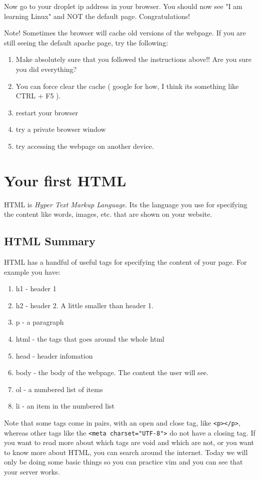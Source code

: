 \documentclass[12pt]{article}
\begin{document}
Now go to your droplet ip address in your browser. You should now see "I am learning Linux" and NOT the default page. Congratulations!

Note! Sometimes the browser will cache old versions of the webpage. If you are still seeing the default apache page, try the following:

\begin{enumerate}
\item Make absolutely sure that you followed the instructions above!! Are you sure you did everything?
\item You can force clear the cache ( google for how, I think its something like CTRL + F5 ). 
\item restart your browser
\item try a private browser window
\item try accessing the webpage on another device.
\end{enumerate}

\pagebreak
\section{Your first HTML}
HTML is \textit{Hyper Text Markup Language}. Its the language you use for specifying the content like words, images, etc. that are shown on your website.
\subsection{HTML Summary}
HTML has a handful of useful tags for specifying the content of your page. For example you have:
\begin{enumerate}
    \item h1 - header 1
    \item h2 - header 2. A little smaller than header 1.
    \item p - a paragraph
    \item html - the tags that goes around the whole html
    \item head - header infomation
    \item body - the body of the webpage. The content the user will see.
    \item ol - a numbered list of items
    \item li - an item in the numbered list
\end{enumerate}

Note that some tags come in pairs, with an open and close tag, like \verb|<p></p>|, whereas other tags like the \verb|<meta charset="UTF-8">| do not have a closing tag.
If you want to read more about which tags are void and which are not, or you want to know more about HTML, you can search around the internet. Today we will only be doing some basic things so you can practice vim and you can see that  your server works.
\end{document}
